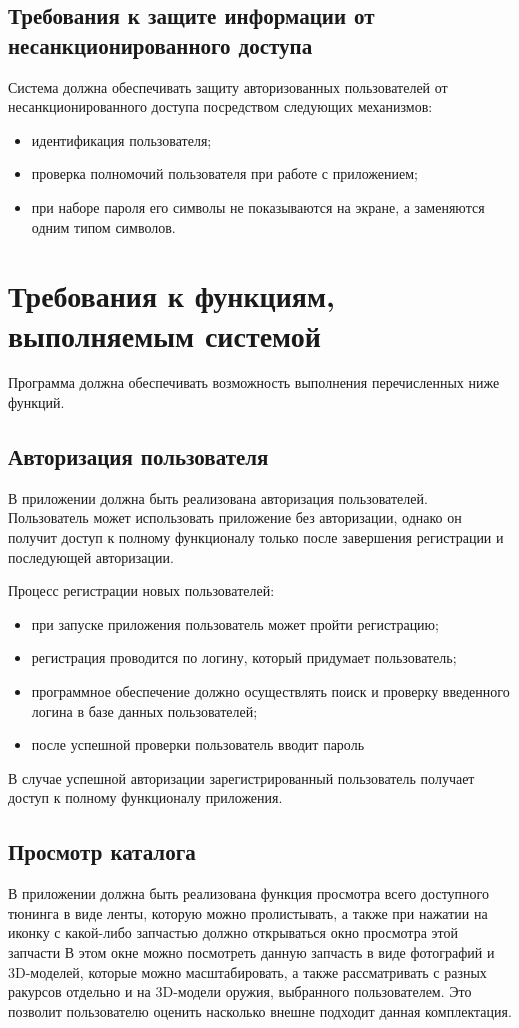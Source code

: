 \documentclass[14pt]{extreport}
\begin{document}
\subsection{Требования к защите информации от \\ несанкционированного доступа}
Система должна обеспечивать защиту авторизованных пользователей от несанкционированного доступа посредством следующих механизмов:
\begin{itemize}
	\item идентификация пользователя;
	\item проверка полномочий пользователя при работе с приложением;
	\item при наборе пароля его символы не показываются на экране, а заменяются одним типом символов.
\end{itemize}

\section{Требования к функциям, выполняемым системой}
Программа должна обеспечивать возможность выполнения перечисленных ниже
функций.

\subsection{Авторизация пользователя}
В приложении должна быть реализована авторизация пользователей. Пользователь может использовать приложение без авторизации, однако он получит доступ к полному функционалу только после завершения регистрации и последующей авторизации.

Процесс регистрации новых пользователей:
\begin{itemize}
	\item при запуске приложения пользователь может пройти регистрацию;
	\item регистрация проводится по логину, который придумает пользователь;
	\item программное обеспечение должно осуществлять поиск и проверку
введенного логина в базе данных пользователей;
	\item после успешной проверки пользователь вводит пароль
\end{itemize}

В случае успешной авторизации зарегистрированный пользователь получает доступ к полному функционалу приложения.

\subsection{Просмотр каталога}
В приложении должна быть реализована функция просмотра всего доступного тюнинга в виде ленты, которую можно пролистывать, а также при нажатии на иконку с какой-либо запчастью должно открываться окно просмотра этой запчасти В этом окне можно посмотреть данную запчасть в виде фотографий и 3D-моделей, которые можно масштабировать, а также рассматривать с разных ракурсов отдельно и на 3D-модели оружия, выбранного пользователем. Это позволит пользователю оценить насколько внешне подходит данная комплектация.
\end{document}
